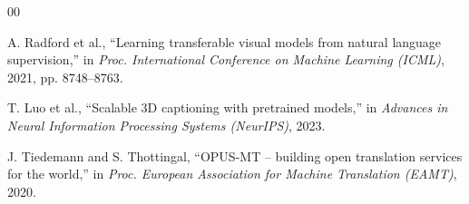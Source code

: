 \documentclass[conference]{IEEEtran}
\begin{document}
\begin{thebibliography}{00}

A. Radford et al., ``Learning transferable visual models from natural language supervision,''
in \textit{Proc. International Conference on Machine Learning (ICML)}, 2021, pp. 8748--8763.

T. Luo et al., ``Scalable 3D captioning with pretrained models,''
in \textit{Advances in Neural Information Processing Systems (NeurIPS)}, 2023.

J. Tiedemann and S. Thottingal, ``OPUS-MT -- building open translation services for the world,''
in \textit{Proc. European Association for Machine Translation (EAMT)}, 2020.

\end{thebibliography}
\end{document}

